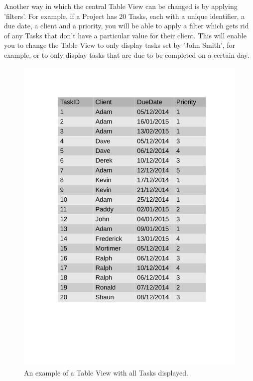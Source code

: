 Another way in which the central Table View can be changed is by applying 'filters'. For example, if a Project has 20 Tasks, each with a unique identifier, a due date, a client and a priority, you will be able to apply a filter which gets rid of any Tasks that don't have a particular value for their client. This will enable you to change the Table View to only display tasks set by 'John Smith', for example, or to only display tasks that are due to be completed on a certain day.

\begin{figure}[H]
    \includegraphics[width=\textwidth]{./Design/Table_View_Example.pdf}
    \caption{An example of a Table View with all Tasks displayed. } \label{fig:TableViewExample}
\end{figure}

